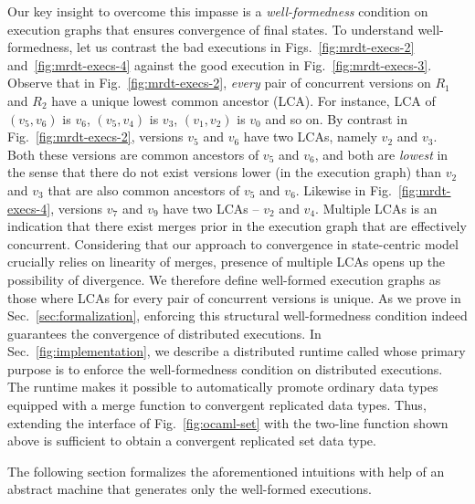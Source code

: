 Our key insight to overcome this impasse is a \emph{well-formedness}
condition on execution graphs that ensures convergence of final
states. To understand well-formedness, let us contrast the bad
executions in Figs.~\ref{fig:mrdt-execs-2} and~\ref{fig:mrdt-execs-4}
against the good execution in Fig.~\ref{fig:mrdt-execs-3}. Observe
that in Fig.~\ref{fig:mrdt-execs-2}, \emph{every} pair of concurrent
versions on $R_1$ and $R_2$ have a unique lowest common ancestor
(LCA). For instance, LCA of $(v_5,v_6)$ is $v_6$, $(v_5,v_4)$ is
$v_3$, $(v_1,v_2)$ is $v_0$ and so on. By contrast in
Fig.~\ref{fig:mrdt-execs-2}, versions $v_5$ and $v_6$ have two LCAs,
namely $v_2$ and $v_3$. Both these versions are common ancestors of
$v_5$ and $v_6$, and both are \emph{lowest} in the sense that there do
not exist versions lower (in the execution graph) than $v_2$ and $v_3$
that are also common ancestors of $v_5$ and $v_6$. Likewise in
Fig.~\ref{fig:mrdt-execs-4}, versions $v_7$ and $v_9$ have two LCAs --
$v_2$ and $v_4$. Multiple LCAs is an indication that there exist
merges prior in the execution graph that are effectively concurrent.
Considering that our approach to convergence in state-centric model
crucially relies on linearity of merges, presence of multiple LCAs
opens up the possibility of divergence. We therefore define
well-formed execution graphs as those where LCAs for every pair of
concurrent versions is unique. As we prove in
Sec.~\ref{sec:formalization}, enforcing this structural
well-formedness condition indeed guarantees the convergence of
distributed executions. In Sec.~\ref{fig:implementation}, we describe
a distributed runtime called \quark whose primary purpose is to
enforce the well-formedness condition on distributed executions. The
runtime makes it possible to automatically promote ordinary data types
equipped with a merge function to convergent replicated data types.
Thus, extending the  interface of Fig.~\ref{fig:ocaml-set} with
the two-line  function shown above is sufficient to
obtain a convergent replicated set data type.

The following section formalizes the aforementioned intuitions with
help of an abstract machine that generates only the well-formed
executions. 
